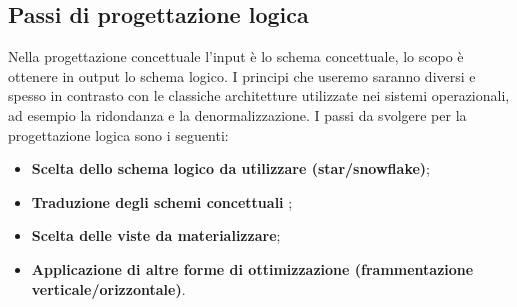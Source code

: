 \subsection{Passi di progettazione logica}
\noindent Nella progettazione concettuale l'input è lo schema concettuale, lo scopo è ottenere in output lo schema logico. I principi che useremo saranno diversi e spesso in contrasto con le classiche architetture utilizzate nei sistemi operazionali, ad esempio la ridondanza e la denormalizzazione. I passi da svolgere per la progettazione logica sono i seguenti:
\begin{itemize}
	\item \textbf{Scelta dello schema logico da utilizzare (star/snowflake)};
	\item \textbf{Traduzione degli schemi concettuali} ;
	\item \textbf{Scelta delle viste da materializzare};
	\item \textbf{Applicazione di altre forme di ottimizzazione (frammentazione verticale/orizzontale)}.
\end{itemize}

